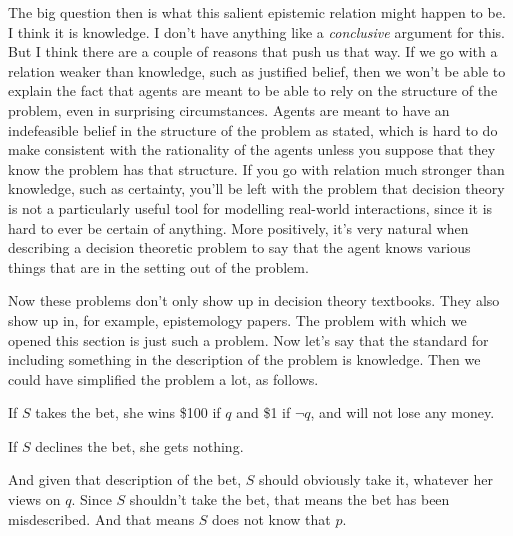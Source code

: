 {The big question then is what this salient epistemic relation might happen to be. I think it is knowledge. I don't have anything like a \textit{conclusive} argument for this. But I think there are a couple of reasons that push us that way. If we go with a relation weaker than knowledge, such as justified belief, then we won't be able to explain the fact that agents are meant to be able to rely on the structure of the problem, even in surprising circumstances. Agents are meant to have an indefeasible belief in the structure of the problem as stated, which is hard to do make consistent with the rationality of the agents unless you suppose that they know the problem has that structure. If you go with relation much stronger than knowledge, such as certainty, you'll be left with the problem that decision theory is not a particularly useful tool for modelling real-world interactions, since it is hard to ever be certain of anything. More positively, it's very natural when describing a decision theoretic problem to say that the agent knows various things that are in the setting out of the problem.

Now these problems don't only show up in decision theory textbooks. They also show up in, for example, epistemology papers. The problem with which we opened this section is just such a problem. Now let's say that the standard for including something in the description of the problem is knowledge. Then we could have simplified the problem a lot, as follows.

\begin{itemize*}
\item If \(S\) takes the bet, she wins \$100 if \(q\) and \$1 if \(\neg q\), and will not lose any money.
\item If \(S\) declines the bet, she gets nothing.
\end{itemize*}

\noindent And given that description of the bet, \(S\) should obviously take it, whatever her views on \(q\). Since \(S\) shouldn't take the bet, that means the bet has been misdescribed. And that means \(S\) does not know that \(p\).}